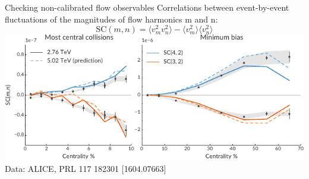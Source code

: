 \documentclass{beamer}
\begin{document}
\begin{frame}{Checking non-calibrated flow observables}
  Correlations between event-by-event fluctuations of the magnitudes of flow harmonics m and n:
  \begin{equation*}
    \text{SC}(m, n) = \langle v_m^2 v_n^2 \rangle - \langle v_m^2 \rangle \langle v_n^2 \rangle 
  \end{equation*}
    \includegraphics{flow_corr} \\[1ex]
    \hfill \tiny Data: ALICE, PRL 117 182301 [1604.07663]
\end{frame}
\end{document}
